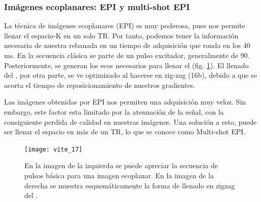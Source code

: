 \subsubsection{Imágenes ecoplanares: EPI y multi-shot EPI}
La técnica de imágenes ecoplanares (EPI) es muy poderosa, pues nos permite llenar el espacio-K en un solo TR. Por tanto, podemos tener la información necesaria de nuestra rebanada en un tiempo de adquisición que ronda en los 40 ms.  En la secuencia clásica se parte de un pulso excitador, generalmente de 90. Posteriormente, se generan los ecos necesarios para llenar el \espaciok (fig. \ref{fig:seq_EPI}). El llenado del \espaciok, por otra parte, se ve optimizado al hacerse en zig-zag (16b), debido a que se acorta el tiempo de reposicionamiento de nuestros gradientes. 

Las imágenes obtenidas por EPI nos permiten una adquisición muy veloz. Sin embargo, este factor esta limitado por la atenuación de la señal, con la consiguiente perdida de calidad en nuestras imágenes. Una solución a esto, puede ser llenar el espacio en más de un TR, lo que se conoce como Multi-shot EPI. 


\begin{figure}[htb]
\begin{figg}
   \texttt{[image: vite\_17]}
   \caption{En la imagen de la izquierda se puede apreciar la secuencia de pulsos básica para una imagen ecoplanar. En la imagen de la derecha se muestra esquemáticamente la forma de llenado en zigzag del \espaciok.}
 \label{fig:seq_EPI}
 \end{figg}
\end{figure}




